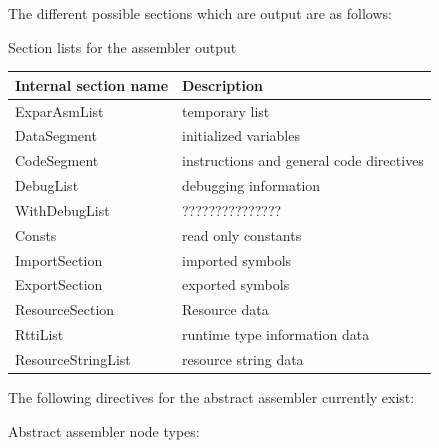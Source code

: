 \documentclass [a4paper,12pt]{article}
\begin{document}
The different possible sections which are output are as follows:

\begin{center}
Section lists for the assembler output
\end{center}

\begin{longtable}{|l|p{10cm}|}
\hline
Internal section name & Description \\
\hline
\endhead
\hline
\endfoot
ExparAsmList    & temporary list \\
DataSegment     & initialized variables \\
CodeSegment     & instructions and general code directives \\
DebugList       & debugging information \\
WithDebugList   & ??????????????? \\
Consts          & read only constants \\
ImportSection   & imported symbols \\
ExportSection   & exported symbols \\
ResourceSection & Resource data \\
RttiList        & runtime type information data \\
ResourceStringList& resource string data
\end{longtable}

The following directives for the abstract assembler currently exist:

Abstract assembler node types:
\end{document}

